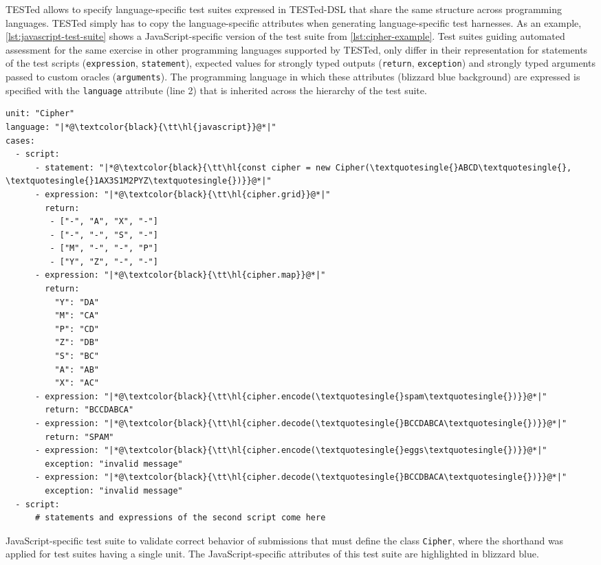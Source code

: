 \documentclass[../main]{subfiles}
\begin{document}
TESTed allows to specify language-specific test suites expressed in TESTed-DSL that share the same structure across programming languages.
TESTed simply has to copy the language-specific attributes when generating language-specific test harnesses.
As an example, \vref{lst:javascript-test-suite} shows a JavaScript-specific version of the test suite from \vref{lst:cipher-example}.
Test suites guiding automated assessment for the same exercise in other programming languages supported by TESTed, only differ in their representation for statements of the test scripts (\texttt{expression}, \texttt{statement}), expected values for strongly typed outputs (\texttt{return}, \texttt{exception}) and strongly typed arguments passed to custom oracles (\texttt{arguments}).
The programming language in which these attributes (blizzard blue background) are expressed is specified with the \texttt{language} attribute (line 2) that is inherited across the hierarchy of the test suite.

\begin{listing}
    \begin{verbatim}
unit: "Cipher"
language: "|*@\textcolor{black}{\tt\hl{javascript}}@*|"
cases:
  - script:
      - statement: "|*@\textcolor{black}{\tt\hl{const cipher = new Cipher(\textquotesingle{}ABCD\textquotesingle{}, \textquotesingle{}1AX3S1M2PYZ\textquotesingle{})}}@*|"
      - expression: "|*@\textcolor{black}{\tt\hl{cipher.grid}}@*|"
        return:
         - ["-", "A", "X", "-"]
         - ["-", "-", "S", "-"]
         - ["M", "-", "-", "P"]
         - ["Y", "Z", "-", "-"]
      - expression: "|*@\textcolor{black}{\tt\hl{cipher.map}}@*|"
        return:
          "Y": "DA"
          "M": "CA"
          "P": "CD"
          "Z": "DB"
          "S": "BC"
          "A": "AB"
          "X": "AC"
      - expression: "|*@\textcolor{black}{\tt\hl{cipher.encode(\textquotesingle{}spam\textquotesingle{})}}@*|"
        return: "BCCDABCA"
      - expression: "|*@\textcolor{black}{\tt\hl{cipher.decode(\textquotesingle{}BCCDABCA\textquotesingle{})}}@*|"
        return: "SPAM"
      - expression: "|*@\textcolor{black}{\tt\hl{cipher.encode(\textquotesingle{}eggs\textquotesingle{})}}@*|"
        exception: "invalid message"
      - expression: "|*@\textcolor{black}{\tt\hl{cipher.decode(\textquotesingle{}BCCDBACA\textquotesingle{})}}@*|"
        exception: "invalid message"
  - script:
      # statements and expressions of the second script come here
    \end{verbatim}
    \caption[]{
        JavaScript-specific test suite to validate correct behavior of submissions that must define the class \texttt{Cipher}, where the shorthand was applied for test suites having a single unit.
        The JavaScript-specific attributes of this test suite are highlighted in blizzard blue.
    }
    \label{lst:javascript-test-suite}
\end{listing}
\end{document}
